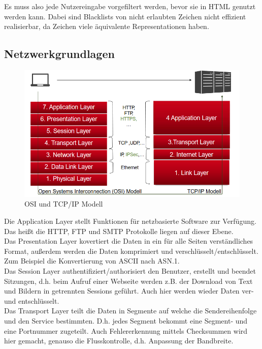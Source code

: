\documentclass[a4paper,12pt,leqno]{article}
\begin{document}
Es muss also jede Nutzereingabe vorgefiltert werden, bevor sie in HTML genutzt werden kann. Dabei sind Blacklists von nicht erlaubten Zeichen nicht effizient realisierbar, da Zeichen viele äquivalente Representationen haben.

\subsection{Netzwerkgrundlagen}

\begin{figure}[h!]
\centering
\includegraphics[scale=0.6]{Grafiken/OSI-TCPIP.png}
\caption{OSI und TCP/IP Modell}
\end{figure}
Die Application Layer stellt Funktionen für netzbasierte Software zur Verfügung. Das heißt die HTTP, FTP und SMTP Protokolle liegen auf dieser Ebene.\\

Das Presentation Layer kovertiert die Daten in ein für alle Seiten verständliches Format, außerdem werden die Daten komprimiert und verschlüsselt/entschlüsselt. Zum Beispiel die Konvertierung von ASCII nach ASN.1.\\

Das Session Layer authentifiziert/authorisiert den Benutzer, erstellt und beendet Sitzungen, d.h. beim Aufruf einer Webseite werden z.B. der Download von Text und Bildern in getrennten Sessions geführt. Auch hier werden wieder Daten ver- und entschlüsselt.\\

Das Transport Layer teilt die Daten in Segmente auf welche die Sendereihenfolge und den Service bestimmten.
D.h. jedes Segment bekommt eine Segment- und eine Portnummer zugeteilt.
Auch Fehlererkennung mittels Checksummen wird hier gemacht, genauso die Flusskontrolle, d.h. Anpassung der Bandbreite.\\ 
\end{document}
